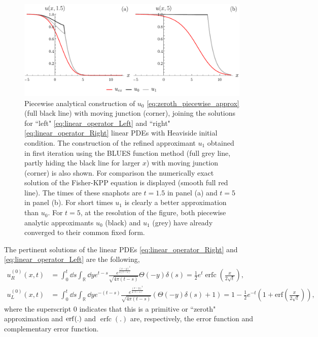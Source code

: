 \documentclass[amsmath,amssymb,amsfonts,aps,pre,preprint,superscriptaddress,showpacs,showkeys,longbibliography,nofootinbib]{revtex4-1}
\newcommand*{\lop}{\mathcal{L}\,}
\DeclareMathOperator{\erfc}{erfc}
\begin{document}
\begin{figure}[t]
    \centering
    \includegraphics[width=\linewidth]{Figures/PiecewiseApproxGridAlt.pdf}
    \caption{Piecewise analytical construction of $u_0$ \eqref{eq:zeroth_piecewise_approx} (full black line) with moving junction (corner), joining the solutions for ``left" \eqref{eq:linear_operator_Left} and ``right" \eqref{eq:linear_operator_Right} linear PDEs with Heaviside initial condition. The construction of the refined approximant $u_1$ obtained in first iteration using the BLUES function method (full grey line, partly hiding the black line for larger $x$) with moving junction (corner) is also shown. For comparison the  numerically exact solution  of the Fisher-KPP equation is  displayed (smooth full red line). The times of these snaphots are $t=1.5$ in panel (a) and $t=5$ in panel (b). For short times $u_1$ is clearly a better approximation than $u_0$. For $t=5$, at the resolution of the figure, both piecewise analytic approximants $u_0$ (black)  and $u_1$ (grey) have already converged to their common fixed form.}
    \label{fig:PiecewiseApproxAlt2}
\end{figure}

The pertinent solutions of the linear PDEs \eqref{eq:linear_operator_Right} and \eqref{eq:linear_operator_Left} are the following,
\begin{align}\label{eq:BLUES_zero_iteration_Right}
       u^{(0)}_R(x,t)&= \int_{0}^{t} \dd{s}\int_{\mathbb{R}} \dd{y} e^{t-s}\frac{e^{\frac{(x-y)^2}{4 (t-s)}}}{\sqrt{4 \pi (t-s)}} \Theta(-y)\delta(s) 
       = \frac{1}{2} e^t \erfc\left(\frac{x}{2 \sqrt{t}}\right),\\
       u^{(0)}_L(x,t) &= \int_{0}^{t} \dd{s}\int_{\mathbb{R}} \dd{y} e^{-(t-s)}\frac{e^{\frac{(x-y)^2}{4 (t-s)}}}{\sqrt{4 \pi (t-s)}} (\Theta(-y)\delta(s)+1) 
       =  1-\frac{1}{2} e^{-t} \left(1+\text{erf}\left(\frac{x}{2 \sqrt{t}}\right)\right),
       \label{eq:BLUES_zero_iteration_Left}
    \end{align}
where the superscript $0$ indicates that this is a primitive or ``zeroth" approximation and $\erf(.)$ and $\erfc(.)$ are, respectively, the error function and complementary error function. 
\end{document}
